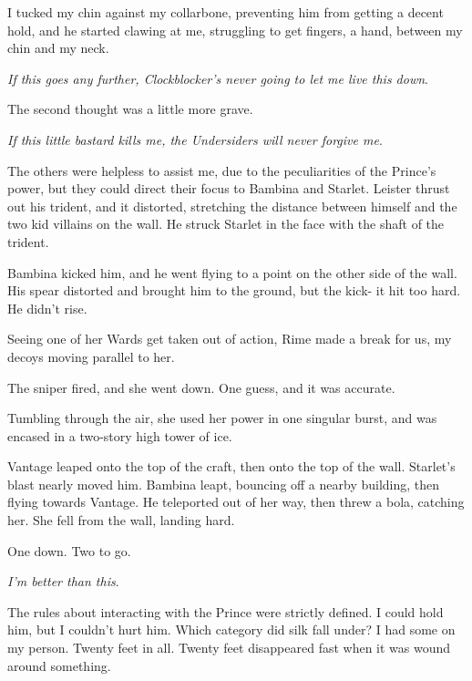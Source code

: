 I tucked my chin against my collarbone, preventing him from getting a decent hold, and he started clawing at me, struggling to get fingers, a hand, between my chin and my neck.



\emph{If this goes any further, Clockblocker's never going to let me live this down}.



The second thought was a little more grave.



\emph{If this little bastard kills me, the Undersiders will never forgive me}.



The others were helpless to assist me, due to the peculiarities of the Prince's power, but they could direct their focus to Bambina and Starlet.  Leister thrust out his trident, and it distorted, stretching the distance between himself and the two kid villains on the wall.  He struck Starlet in the face with the shaft of the trident.



Bambina kicked him, and he went flying to a point on the other side of the wall.  His spear distorted and brought him to the ground, but the kick- it hit too hard.  He didn't rise.



Seeing one of her Wards get taken out of action, Rime made a break for us, my decoys moving parallel to her.



The sniper fired, and she went down.  One guess, and it was accurate.



Tumbling through the air, she used her power in one singular burst, and was encased in a two-story high tower of ice.



Vantage leaped onto the top of the craft, then onto the top of the wall.  Starlet's blast nearly moved him.  Bambina leapt, bouncing off a nearby building, then flying towards Vantage.  He teleported out of her way, then threw a bola, catching her.  She fell from the wall, landing hard.



One down.  Two to go.



\emph{I'm better than this}.



The rules about interacting with the Prince were strictly defined.  I could hold him, but I couldn't hurt him.  Which category did silk fall under?  I had some on my person.  Twenty feet in all.  Twenty feet disappeared fast when it was wound around something.



